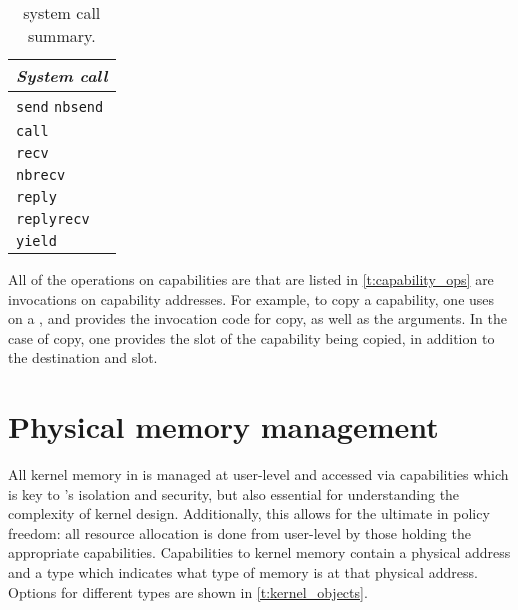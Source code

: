 \begin{table} 
    \centering
    \begin{tabular}{l}\toprule
        \emph{System call} \\\midrule
        \texttt{send} 
        \texttt{nbsend}    \\
        \texttt{call}      \\
        \texttt{recv}      \\
        \texttt{nbrecv}    \\
        \texttt{reply}     \\
        \texttt{replyrecv} \\
        \texttt{yield}     \\
        \bottomrule
    \end{tabular}
    \caption{\selfour system call summary.}
    \label{t:system-calls}
\end{table}

All of the operations on capabilities are that are listed in \cref{t:capability_ops} are invocations
on  capability addresses. For example, to copy a capability, one uses  on a
, and provides the invocation code for copy, as well as the arguments. In the case of
copy, one provides the slot of the capability being copied, in addition to the destination
 and
slot. 

\section{Physical memory management}

All kernel memory in \selfour is managed at user-level and accessed via capabilities
which is key to \selfour's isolation and security, but also essential for
understanding the complexity of kernel design. Additionally, this allows for the ultimate in policy
freedom: all resource allocation is done from user-level by those holding the appropriate
capabilities. Capabilities to kernel memory contain a physical address and a type which indicates
what type of memory is at that physical address. Options for different types are shown in
\cref{t:kernel_objects}. 

